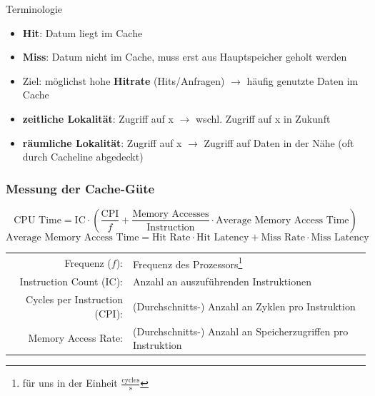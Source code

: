 \documentclass[
  german,            %
  aspectratio=169,    %
]{tumbeamer}
\begin{document}
    

\begin{frame}[c, fragile]{Terminologie}
  \begin{itemize}
    \item \textbf{Hit}: Datum liegt im Cache
    \item \textbf{Miss}: Datum nicht im Cache, muss erst aus Hauptspeicher geholt werden
    \item Ziel: möglichst hohe \textbf{Hitrate} (Hits/Anfragen) $\rightarrow$ häufig genutzte Daten im Cache
    \item \textbf{zeitliche Lokalität}: Zugriff auf x $\rightarrow$ wschl. Zugriff auf x in Zukunft
    \item \textbf{räumliche Lokalität}: Zugriff auf x $\rightarrow$ Zugriff auf Daten in der Nähe (oft durch Cacheline abgedeckt)
  \end{itemize}
\end{frame}

\begin{frame}
  \frametitle{Messung der Cache-Güte}
  \vfill
  \begin{equation*}
    \text{CPU Time} = \text{IC} \cdot \left(\dfrac{\text{CPI}}{f} + \frac{\text{Memory Accesses}}{\text{Instruction}} \cdot \text{Average Memory Access Time}\right)
  \end{equation*}
  \begin{equation*}
    \text{Average Memory Access Time} = \text{Hit Rate} \cdot \text{Hit Latency} + \text{Miss Rate} \cdot \text{Miss Latency}
  \end{equation*}
  \vfill
  {\renewcommand{\arraystretch}{1.4}
      \begin{tabular}{rl}
          Frequenz ($f$): & Frequenz des Prozessors\footnote{für uns in der Einheit $\frac{\text{cycles}}{\text{s}}$}\\
          Instruction Count (IC): & Anzahl an auszuführenden Instruktionen\\
          Cycles per Instruction (CPI): & (Durchschnitts-) Anzahl an Zyklen pro Instruktion\\
          Memory Access Rate: & (Durchschnitts-) Anzahl an Speicherzugriffen pro Instruktion\\
  \end{tabular}}
\end{frame}
\end{document}
